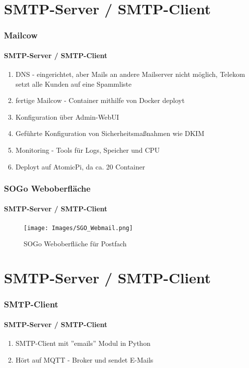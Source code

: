\documentclass[]{beamer}
\begin{document}
\section{SMTP-Server / SMTP-Client}
\begin{frame}
	\frametitle{Mailcow}
	\framesubtitle{SMTP-Server / SMTP-Client}
	\begin{enumerate}
		\item DNS - eingerichtet, aber Mails an andere Mailserver nicht möglich, Telekom setzt alle Kunden auf eine Spammliste
    \item fertige Mailcow - Container mithilfe von Docker deployt
    \item Konfiguration über Admin-WebUI
    \item Geführte Konfiguration von Sicherheitsmaßnahmen wie DKIM
    \item Monitoring - Tools für Logs, Speicher und CPU
    \item Deployt auf AtomicPi, da ca. 20 Container
	\end{enumerate}
\end{frame}

\begin{frame}
	\frametitle{SOGo Weboberfläche}
	\framesubtitle{SMTP-Server / SMTP-Client}
	\begin{figure}
		\begin{minipage}[t]{1\textwidth}
			\centering
			\texttt{[image: Images/SGO\_Webmail.png]}
		\end{minipage}
		\caption{SOGo Weboberfläche für Postfach}
	\end{figure}
\end{frame}

\section{SMTP-Server / SMTP-Client}
\begin{frame}
	\frametitle{SMTP-Client}
	\framesubtitle{SMTP-Server / SMTP-Client}
	\begin{enumerate}
    \item SMTP-Client mit ''emails'' Modul in Python
    \item Hört auf MQTT - Broker und sendet E-Mails
	\end{enumerate}
\end{frame}
\end{document}
